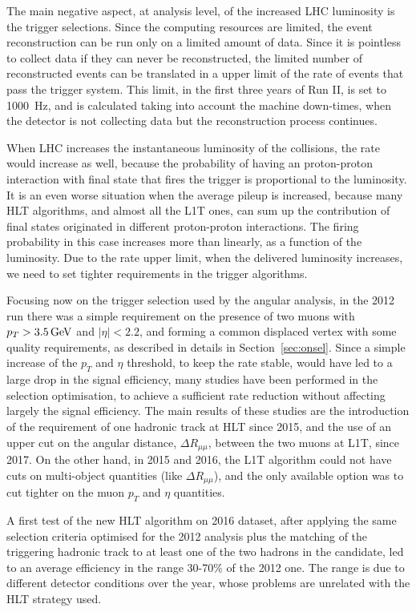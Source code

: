 The main negative aspect, at analysis level, of the increased LHC luminosity is the trigger selections.
Since the computing resources are limited, the event reconstruction can be run only on a limited amount of data.
Since it is pointless to collect data if they can never be reconstructed, the limited number of reconstructed events can be translated in a upper limit of the rate of events that pass the trigger system.
This limit, in the first three years of Run II, is set to \SI{1000}{\hertz}, and is calculated taking into account the machine down-times, when the detector is not collecting data but the reconstruction process continues.

When LHC increases the instantaneous luminosity of the collisions, the rate would increase as well, because the probability of having an proton-proton interaction with final state that fires the trigger is proportional to the luminosity.
It is an even worse situation when the average pileup is increased, because many HLT algorithms, and almost all the L1T ones, can sum up the contribution of final states originated in different proton-proton interactions.
The firing probability in this case increases more than linearly, as a function of the luminosity.
Due to the rate upper limit, when the delivered luminosity increases, we need to set tighter requirements in the trigger algorithms.

Focusing now on the trigger selection used by the \BtoKstmumu angular analysis, in the 2012 run there was a simple requirement on the presence of two muons with $p_T>3.5\,\textrm{GeV}$ and $|\eta|<2.2$, and forming a common displaced vertex with some quality requirements, as described in details in Section~\ref{sec:onsel}.
Since a simple increase of the $p_T$ and $\eta$ threshold, to keep the rate stable, would have led to a large drop in the signal efficiency, many studies have been performed in the selection optimisation, to achieve a sufficient rate reduction without affecting largely the signal efficiency.
The main results of these studies are the introduction of the requirement of one hadronic track at HLT since 2015, and the use of an upper cut on the angular distance, $\Delta R_{\mu\mu}$, between the two muons at L1T, since 2017.
On the other hand, in 2015 and 2016, the L1T algorithm could not have cuts on multi-object quantities (like $\Delta R_{\mu\mu}$), and the only available option was to cut tighter on the muon $p_T$ and $\eta$ quantities.

A first test of the new HLT algorithm on 2016 dataset, after applying the same selection criteria optimised for the 2012 analysis plus the matching of the triggering hadronic track to at least one of the two hadrons in the candidate, led to an average efficiency in the range 30-70\% of the 2012 one.
The range is due to different detector conditions over the year, whose problems are unrelated with the HLT strategy used.

